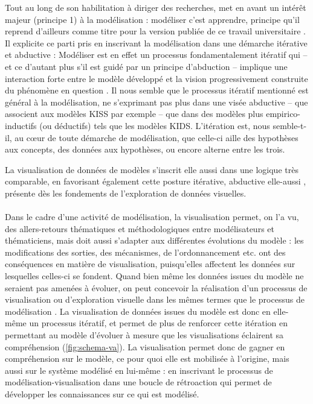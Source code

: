 \documentclass[a4paper, 12pt]{article}
\begin{document}
Tout au long de son habilitation à diriger des recherches,  met en avant un intérêt majeur (principe 1) à la modélisation : \og modéliser c'est apprendre\fg{}, principe qu'il reprend d'ailleurs comme titre pour la version publiée de ce travail universitaire \autocite{banos_modeliser_2016}.
Il explicite ce parti pris en inscrivant la modélisation dans une démarche itérative et abductive : \og
Modéliser est en effet un processus fondamentalement itératif qui -- et ce d'autant plus s'il est guidé par un principe d'abduction -- implique une interaction forte entre le modèle développé et la vision progressivement construite du phénomène en question
\fg{} \autocite[77]{banos_pour_2013}.
Il nous semble que le processus itératif mentionné est général à la modélisation, ne s'exprimant pas plus dans une visée abductive -- que \textcite{livet2014diversite} associent aux modèles KISS par exemple -- que dans des modèles plus empirico-inductifs (ou déductifs) tels que les modèles KIDS.
L'itération est, nous semble-t-il, au cœur de toute démarche de modélisation, que celle-ci aille des hypothèses aux concepts, des données aux hypothèses, ou encore alterne entre les trois. 

La visualisation de données de modèles s'inscrit elle aussi dans une logique très comparable, en favorisant également cette posture itérative, abductive elle-aussi \autocite[\ppno~239--240]{banos2005voie}, présente dès les fondements de l'exploration de données visuelles.

\paragraph{}
Dans le cadre d'une activité de modélisation, la visualisation permet, on l'a vu, des allers-retours thématiques et méthodologiques entre modélisateurs et thématiciens, mais doit aussi s'adapter aux différentes évolutions du modèle : les modifications des sorties, des mécanismes, de l'ordonnancement etc. ont des conséquences en matière de visualisation, puisqu'elles affectent les données sur lesquelles celles-ci se fondent.
Quand bien même les données issues du modèle ne seraient pas amenées à évoluer, on peut concevoir la réalisation d'un processus de visualisation ou d'exploration visuelle dans les mêmes termes que le processus de modélisation \autocite{andrienko2018viewing}.
La visualisation de données issues du modèle est donc en elle-même un processus itératif, et permet de plus de renforcer cette itération en permettant au modèle d'évoluer à mesure que les visualisations éclairent sa compréhension (\cref{fig:schema-va}).
La visualisation permet donc de gagner en compréhension sur le modèle, ce pour quoi elle est mobilisée à l'origine, mais aussi sur le système modélisé en lui-même : en inscrivant le processus de modélisation-visualisation dans une boucle de rétroaction qui permet de développer les connaissances sur ce qui est modélisé.
\end{document}
